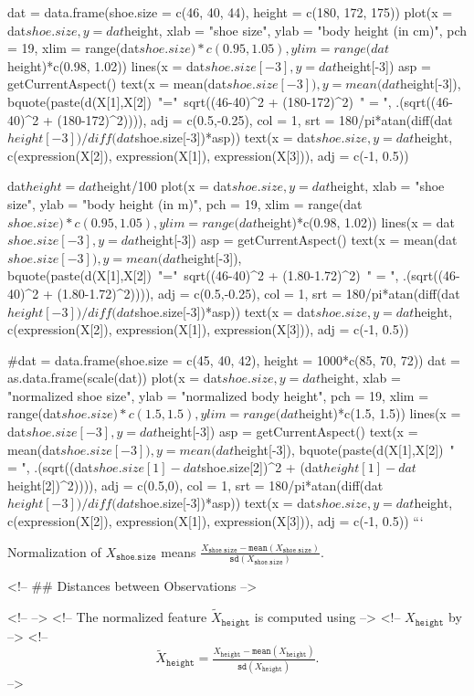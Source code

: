 dat = data.frame(shoe.size = c(46, 40, 44), height = c(180, 172, 175))
plot(x = dat$shoe.size, y = dat$height, xlab = "shoe size", ylab = "body height (in cm)",
  pch = 19, xlim = range(dat$shoe.size)*c(0.95, 1.05), ylim = range(dat$height)*c(0.98, 1.02))
lines(x = dat$shoe.size[-3], y = dat$height[-3])
asp = getCurrentAspect()
text(x = mean(dat$shoe.size[-3]), y = mean(dat$height[-3]),
  bquote(paste(d(X[1],X[2])~"="~sqrt((46-40)^2 + (180-172)^2)~" = ", .(sqrt((46-40)^2 + (180-172)^2)))),
  adj = c(0.5,-0.25), col = 1, srt = 180/pi*atan(diff(dat$height[-3])/diff(dat$shoe.size[-3])*asp))
text(x = dat$shoe.size, y = dat$height, c(expression(X[2]), expression(X[1]), expression(X[3])), adj = c(-1, 0.5))


dat$height = dat$height/100
plot(x = dat$shoe.size, y = dat$height, xlab = "shoe size", ylab = "body height (in m)",
  pch = 19, xlim = range(dat$shoe.size)*c(0.95, 1.05), ylim = range(dat$height)*c(0.98, 1.02))
lines(x = dat$shoe.size[-3], y = dat$height[-3])
asp = getCurrentAspect()
text(x = mean(dat$shoe.size[-3]), y = mean(dat$height[-3]),
  bquote(paste(d(X[1],X[2])~"="~sqrt((46-40)^2 + (1.80-1.72)^2)~" = ", .(sqrt((46-40)^2 + (1.80-1.72)^2)))),
  adj = c(0.5,-0.25), col = 1, srt = 180/pi*atan(diff(dat$height[-3])/diff(dat$shoe.size[-3])*asp))
text(x = dat$shoe.size, y = dat$height, c(expression(X[2]), expression(X[1]), expression(X[3])), adj = c(-1, 0.5))

#dat = data.frame(shoe.size = c(45, 40, 42), height = 1000*c(85, 70, 72))
dat = as.data.frame(scale(dat))
plot(x = dat$shoe.size, y = dat$height, xlab = "normalized shoe size", ylab = "normalized body height",
  pch = 19, xlim = range(dat$shoe.size)*c(1.5, 1.5), ylim = range(dat$height)*c(1.5, 1.5))
lines(x = dat$shoe.size[-3], y = dat$height[-3])
asp = getCurrentAspect()
text(x = mean(dat$shoe.size[-3]), y = mean(dat$height[-3]),
  bquote(paste(d(X[1],X[2])~" = ", .(sqrt((dat$shoe.size[1]-dat$shoe.size[2])^2 + (dat$height[1]-dat$height[2])^2)))),
  adj = c(0.5,0), col = 1, srt = 180/pi*atan(diff(dat$height[-3])/diff(dat$shoe.size[-3])*asp))
text(x = dat$shoe.size, y = dat$height, c(expression(X[2]), expression(X[1]), expression(X[3])), adj = c(-1, 0.5))
```

Normalization of $X_{\texttt{shoe.size}}$ means $\tfrac{X_{\texttt{shoe.size}}-\texttt{mean}(X_{\texttt{shoe.size}})}{\texttt{sd}(X_{\texttt{shoe.size}})}.$

<!-- ## Distances between Observations -->

<!-- \small -->
<!-- The normalized feature $\tilde{X}_{\texttt{height}}$ is computed using  -->
<!-- $X_{\texttt{height}}$ by -->
<!-- \[\tilde{X}_{\texttt{height}} = \tfrac{X_{\texttt{height}}-\texttt{mean}(X_{\texttt{height}})}{\texttt{sd}(X_{\texttt{height}})}.\] -->


